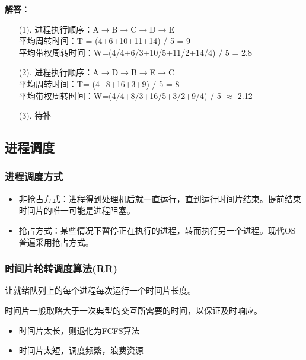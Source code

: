 \documentclass[12pt, a4paper, oneside]{ctexart}
\newenvironment{solution}{\begin{shaded}\par\noindent\textbf{解答：}}{\end{shaded}\par}
\begin{document}
\begin{solution}
    \begin{enumerate}
        \item [(1). ]
        进程执行顺序：A$\rightarrow$B$\rightarrow$C$\rightarrow$D$\rightarrow$E\\
        平均周转时间：T = (4+6+10+11+14) / 5 = 9\\
        平均带权周转时间：W=(4/4+6/3+10/5+11/2+14/4) / 5 = 2.8
        \item [(2). ]
        进程执行顺序：A$\rightarrow$D$\rightarrow$B$\rightarrow$E$\rightarrow$C\\
        平均周转时间：T= (4+8+16+3+9) / 5 = 8 \\
        平均带权周转时间：W=(4/4+8/3+16/5+3/2+9/4) / 5 $\approx$ 2.12
        \item [(3). ]
        待补
    \end{enumerate}
\end{solution}

\subsection{进程调度}

\subsubsection{进程调度方式}

\begin{itemize}
    \item 非抢占方式：进程得到处理机后就一直运行，直到运行时间片结束。提前结束时间片的唯一可能是进程阻塞。
    \item 抢占方式：某些情况下暂停正在执行的进程，转而执行另一个进程。现代OS普遍采用抢占方式。
\end{itemize}

\subsubsection{时间片轮转调度算法(RR)}

让就绪队列上的每个进程每次运行一个时间片长度。

时间片一般取略大于一次典型的交互所需要的时间，以保证及时响应。
\begin{itemize}
    \item 时间片太长，则退化为FCFS算法
    \item 时间片太短，调度频繁，浪费资源
\end{itemize}
\end{document}

